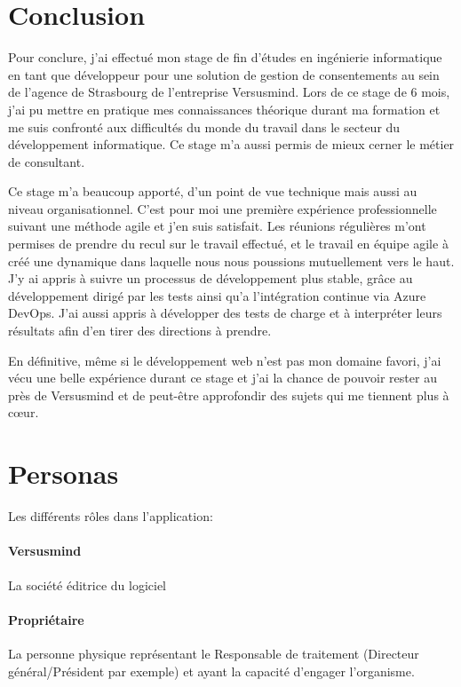\documentclass[12pt, a4paper]{report}
\begin{document}
\chapter{Conclusion}

Pour conclure, j'ai effectué mon stage de fin d'études en ingénierie informatique en tant que développeur pour une solution de gestion de consentements au sein de l'agence de Strasbourg de l'entreprise Versusmind.\newline
Lors de ce stage de 6 mois, j'ai pu mettre en pratique mes connaissances théorique durant ma formation et me suis confronté aux difficultés du monde du travail dans le secteur du développement informatique.
Ce stage m'a aussi permis de mieux cerner le métier de consultant.\newline

Ce stage m'a beaucoup apporté, d'un point de vue technique mais aussi au niveau organisationnel.\newline
C'est pour moi une première expérience professionnelle suivant une méthode agile et j'en suis satisfait.
Les réunions régulières m'ont permises de prendre du recul sur le travail effectué, et le travail en équipe agile à créé une dynamique dans laquelle nous nous poussions mutuellement vers le haut.\newline
J'y ai appris à suivre un processus de développement plus stable, grâce au développement dirigé par les tests ainsi qu'a l'intégration continue via Azure DevOps.\newline
J'ai aussi appris à développer des tests de charge et à interpréter leurs résultats afin d'en tirer des directions à prendre.\newline

En définitive, même si le développement web n'est pas mon domaine favori, j'ai vécu une belle expérience durant ce stage et j'ai la chance de pouvoir rester au près de Versusmind et de peut-être approfondir des sujets qui me tiennent plus à cœur.

\appendix
\chapter{Personas}
Les différents rôles dans l'application:
\subsubsection{Versusmind}
La société éditrice du logiciel
\subsubsection{Propriétaire}
La personne physique représentant le Responsable de traitement (Directeur général/Président par exemple) et ayant la capacité d'engager l'organisme.
\end{document}
